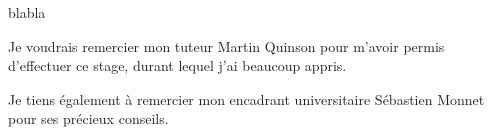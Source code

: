 {\color{white} blabla} \vspace{7cm}


Je voudrais remercier mon tuteur Martin Quinson pour m'avoir permis d'effectuer ce stage, durant lequel j'ai beaucoup appris.

Je tiens également à remercier mon encadrant universitaire Sébastien Monnet pour ses précieux conseils.
